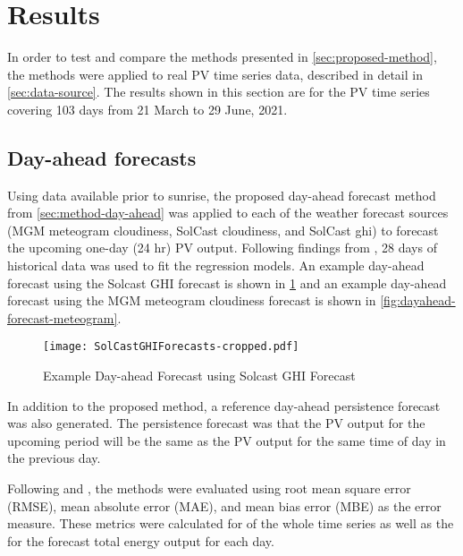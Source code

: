 \section{Results}
\label{sec:results}

In order to test and compare the methods presented in \cref{sec:proposed-method},
the methods were applied to real PV time series data, described in detail in \cref{sec:data-source}.
The results shown in this section are for the PV time series covering
103 days from 21 March to 29 June, 2021.

\subsection{Day-ahead forecasts}

Using data available prior to sunrise, the proposed day-ahead forecast method from  \cref{sec:method-day-ahead} was applied to each of the weather forecast sources
(MGM meteogram cloudiness, SolCast cloudiness, and SolCast ghi)
to forecast the upcoming one-day (24 hr) PV output.
Following findings from \cite{Almeida2015},
28 days of historical data was used to fit the regression models.
An example day-ahead forecast using the Solcast GHI forecast is shown in \cref{fig:dayahead-forecast-solcast}
and an example day-ahead forecast using the MGM meteogram cloudiness forecast is shown in \cref{fig:dayahead-forecast-meteogram}.

\begin{figure}[!ht]
	\centering
	\texttt{[image: SolCastGHIForecasts-cropped.pdf]}
	\caption{Example Day-ahead Forecast using Solcast GHI Forecast}
	\label{fig:dayahead-forecast-solcast}
\end{figure}

In addition to the proposed method, a reference day-ahead persistence forecast was also generated.
The persistence forecast was that the PV output for the upcoming period will be the same as the PV output for the same time of day in the previous day.

Following \cite{Pedro2012} and \cite{Gigoni2018}, the methods were evaluated using root mean square error (RMSE), mean absolute error (MAE), and mean bias error (MBE) as the error measure.
These metrics were calculated for of the whole time series as well as the for the forecast total energy output for each day.

